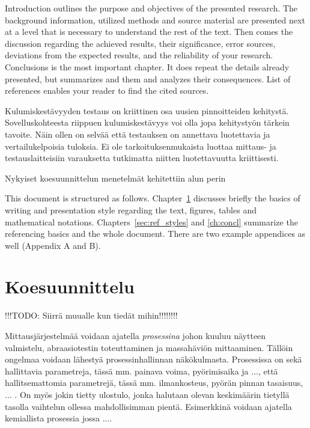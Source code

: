 \documentclass[12pt,a4paper,finnish]{tutthesis}
\newcommand\todo[1]{{\color{red}!!!TODO: #1}} %
\begin{document}
Introduction outlines the purpose and objectives of the presented
research. The background information, utilized methods and source
material are presented next at a level that is necessary to understand
the rest of the text. Then comes the discussion regarding the achieved
results, their significance, error sources, deviations from the
expected results, and the reliability of your research. Conclusions is
the most important chapter. It does repeat the details already
presented, but summarizes and them and analyzes their
consequences. List of references enables your reader to find the cited
sources.

Kulumiskestävyyden testaus on kriittinen osa uusien pinnoitteiden kehitystä.
Sovelluskohteesta riippuen kulumiskestävyys voi olla jopa kehitystyön tärkein
tavoite. Näin ollen on selvää että testauksen on annettava luotettavia ja
vertailukelpoisia tuloksia. Ei ole tarkoituksenmukaista luottaa mittaus- ja
testauslaitteisiin varauksetta tutkimatta niitten luotettavuutta kriittisesti.

Nykyiset koesuunnittelun menetelmät kehitettiin alun perin 


This document is structured as follows. Chapter~\ref{ch:doe}
discusses briefly the basics of writing and presentation style
regarding the text, figures, tables and mathematical
notations. Chapters~\ref{sec:ref_styles} and \ref{ch:concl} summarize
the referencing basics and the whole document. There are two example
appendices as well (Appendix A and B).



\chapter{Koesuunnittelu}
\label{ch:doe}

\todo{Siirrä muualle kun tiedät mihin!!!!!!!!}

Mittausjärjestelmää voidaan ajatella \textit{prosessina} johon kuuluu
näytteen valmistelu, abraasiotestin toteuttaminen ja massahäviön
mittaaminen. Tällöin ongelmaa voidaan lähestyä prosessinhallinnan
näkökulmasta. Prosessissa on sekä hallittavia parametreja, tässä mm. painava
voima, pyörimisaika ja ..., että hallitsemattomia parametrejä, tässä mm.
ilmankosteus, pyörän pinnan tasaisuus, ... . On myös jokin tietty ulostulo,
jonka halutaan olevan keskimäärin tietyllä tasolla vaihtelun ollessa
mahdollisimman pientä. Esimerkkinä voidaan ajatella kemiallista prosessia
jossa ....
\end{document}
